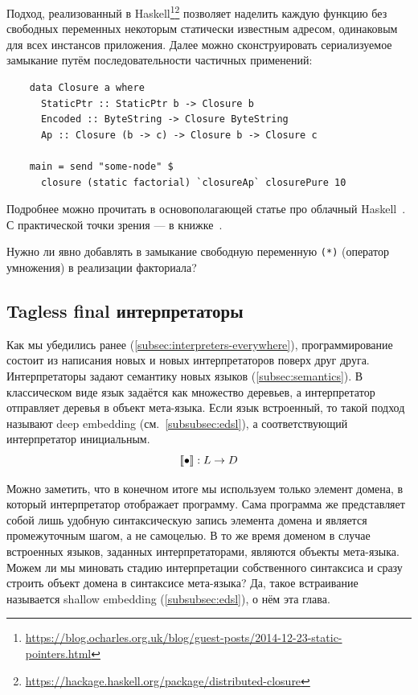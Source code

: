 Подход, реализованный в Haskell\footnote{\url{https://blog.ocharles.org.uk/blog/guest-posts/2014-12-23-static-pointers.html}}\footnote{\url{https://hackage.haskell.org/package/distributed-closure}} позволяет наделить каждую функцию без свободных переменных некоторым статически известным адресом, одинаковым для всех инстансов приложения.
Далее можно сконструировать сериализуемое замыкание путём последовательности частичных применений:
\begin{verbatim}
    data Closure a where
      StaticPtr :: StaticPtr b -> Closure b
      Encoded :: ByteString -> Closure ByteString
      Ap :: Closure (b -> c) -> Closure b -> Closure c

    main = send "some-node" $
      closure (static factorial) `closureAp` closurePure 10
\end{verbatim}

Подробнее можно прочитать в основополагающей статье про облачный Haskell~\cite{epstein2011towards}.
С практической точки зрения --- в книжке~\cite[глава 16]{marlow2011parallel}.

\begin{task}
    Нужно ли явно добавлять в замыкание свободную переменную \texttt{(*)} (оператор умножения) в реализации факториала?
\end{task}

\subsection{Tagless final интерпретаторы} \label{subsec:tagless-final}

Как мы убедились ранее (\ref{subsec:interpreters-everywhere}), программирование состоит из написания новых и новых интерпретаторов поверх друг друга.
Интерпретаторы задают семантику новых языков (\ref{subsec:semantics}).
В классическом виде язык задаётся как множество деревьев, а интерпретатор отправляет деревья в объект мета-языка.
Если язык встроенный, то такой подход называют deep embedding (см.~\ref{subsubsec:edsl}), а соответствующий интерпретатор инициальным.
\[
    \llbracket{\bullet}\rrbracket : L \to D
\]

Можно заметить, что в конечном итоге мы используем только элемент домена, в который интерпретатор отображает программу.
Сама программа же представляет собой лишь удобную синтаксическую запись элемента домена и является промежуточным шагом, а не самоцелью.
В то же время доменом в случае встроенных языков, заданных интерпретаторами, являются объекты мета-языка.
Можем ли мы миновать стадию интерпретации собственного синтаксиса и сразу строить объект домена в синтаксисе мета-языка?
Да, такое встраивание называется shallow embedding (\ref{subsubsec:edsl}), о нём эта глава.

